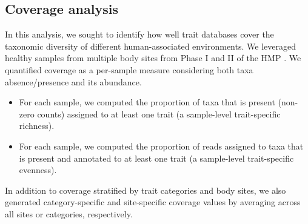 \subsection{Coverage analysis}  

In this analysis, we sought to identify how well trait databases cover the taxonomic diversity of different human-associated environments. We leveraged healthy samples from multiple body sites from Phase I and II of the HMP \cite{consortium2012structure}. We quantified coverage as a per-sample measure considering both taxa absence/presence and its abundance.   
\begin{itemize}
    \item For each sample, we computed the proportion of taxa that is present (non-zero counts) assigned to at least one trait (a sample-level trait-specific richness). 
    \item For each sample, we computed the proportion of reads assigned to taxa that is present and annotated to at least one trait (a sample-level trait-specific evenness).
\end{itemize}

In addition to coverage stratified by trait categories and body sites, we also generated category-specific and site-specific coverage values by averaging across all sites or categories, respectively.  




